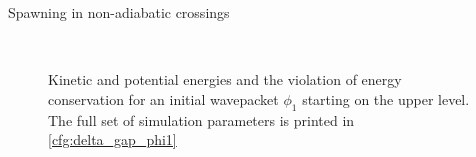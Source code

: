 \begin{chapter}{Spawning in non-adiabatic crossings}
\begin{figure}[h!]
  \centering
   \\
  \caption[Energies for a $\phi_1$ in an avoided crossing]{
  Kinetic and potential energies and the violation of energy conservation for an
  initial wavepacket $\phi_1$ starting on the upper level. The full set of simulation
  parameters is printed in \ref{cfg:delta_gap_phi1}
  \label{fig:basic_delta_gap_phi1_energies}
  }
\end{figure}




\end{chapter}
